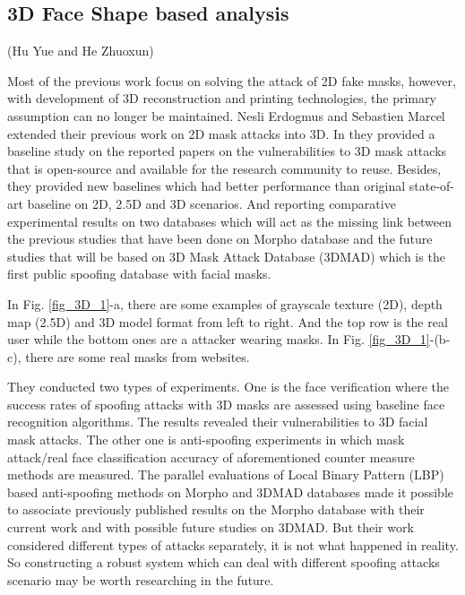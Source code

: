 \documentclass[journal]{IEEEtran}
\begin{document}
\subsection{3D Face Shape based analysis}

(Hu Yue and He Zhuoxun)

Most of the previous work focus on solving the attack of 2D fake masks, however, with development of 3D reconstruction and printing technologies, the primary assumption can no longer be maintained. Nesli Erdogmus and Sebastien Marcel extended their previous work \cite{erdogmus2013spoofing} on 2D mask attacks into 3D. In \cite{erdogmus2014spoofing} they provided a baseline study on the reported papers on the vulnerabilities to 3D mask attacks that is open-source and available for the research community to reuse. Besides, they provided new baselines which had better performance than original state-of-art baseline on 2D, 2.5D and 3D scenarios. And reporting comparative experimental results on two databases which will act as the missing link between the previous studies that have been done on Morpho database and the future studies that will be based on 3D Mask Attack Database (3DMAD) which is the first public spoofing database with facial masks.

In Fig. \ref{fig_3D_1}-a, there are some examples of grayscale texture (2D), depth map (2.5D) and 3D model format from left to right. And the top row is the real user while the bottom ones are a attacker wearing masks. In Fig. \ref{fig_3D_1}-(b-c), there are some real masks from websites.

They conducted two types of experiments. One is the face verification where the success rates of spoofing attacks with 3D masks are assessed using baseline face recognition algorithms. The results revealed their vulnerabilities to 3D facial mask attacks. The other one is anti-spoofing experiments in which mask attack/real face classification accuracy of aforementioned counter measure methods are measured. The parallel evaluations of Local Binary Pattern (LBP) \cite{kose2013countermeasure} based anti-spoofing methods on Morpho and 3DMAD databases made it possible to associate previously published results on the Morpho database with their current work and with possible future studies on 3DMAD. But their work considered different types of attacks separately, it is not what happened in reality. So constructing a robust system which can deal with different spoofing attacks scenario may be worth researching in the future.
\end{document}
